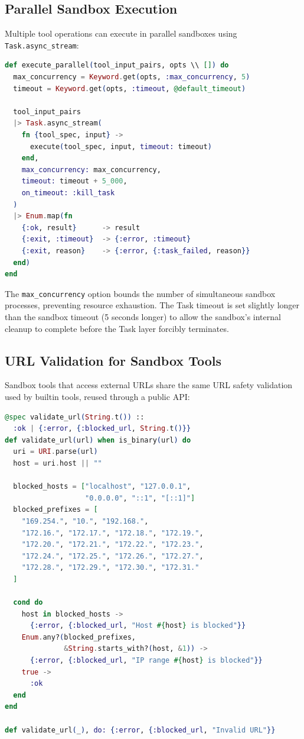 \documentclass[12pt,a4paper]{article}
\theoremstyle{plain}
\theoremstyle{definition}
\begin{document}
\subsection{Parallel Sandbox Execution}

Multiple tool operations can execute in parallel sandboxes using \texttt{Task.async\_stream}:

\begin{lstlisting}[language=elixir, caption={Parallel sandbox execution with controlled concurrency.}, label={lst:parallel-sandbox}]
def execute_parallel(tool_input_pairs, opts \\ []) do
  max_concurrency = Keyword.get(opts, :max_concurrency, 5)
  timeout = Keyword.get(opts, :timeout, @default_timeout)

  tool_input_pairs
  |> Task.async_stream(
    fn {tool_spec, input} ->
      execute(tool_spec, input, timeout: timeout)
    end,
    max_concurrency: max_concurrency,
    timeout: timeout + 5_000,
    on_timeout: :kill_task
  )
  |> Enum.map(fn
    {:ok, result}      -> result
    {:exit, :timeout}  -> {:error, :timeout}
    {:exit, reason}    -> {:error, {:task_failed, reason}}
  end)
end
\end{lstlisting}

The \texttt{max\_concurrency} option bounds the number of simultaneous sandbox processes, preventing resource exhaustion. The Task timeout is set slightly longer than the sandbox timeout (5 seconds longer) to allow the sandbox's internal cleanup to complete before the Task layer forcibly terminates.

\subsection{URL Validation for Sandbox Tools}

Sandbox tools that access external URLs share the same URL safety validation used by builtin tools, reused through a public API:

\begin{lstlisting}[language=elixir, caption={URL validation reused across tiers.}, label={lst:sandbox-url}]
@spec validate_url(String.t()) ::
  :ok | {:error, {:blocked_url, String.t()}}
def validate_url(url) when is_binary(url) do
  uri = URI.parse(url)
  host = uri.host || ""

  blocked_hosts = ["localhost", "127.0.0.1",
                   "0.0.0.0", "::1", "[::1]"]
  blocked_prefixes = [
    "169.254.", "10.", "192.168.",
    "172.16.", "172.17.", "172.18.", "172.19.",
    "172.20.", "172.21.", "172.22.", "172.23.",
    "172.24.", "172.25.", "172.26.", "172.27.",
    "172.28.", "172.29.", "172.30.", "172.31."
  ]

  cond do
    host in blocked_hosts ->
      {:error, {:blocked_url, "Host #{host} is blocked"}}
    Enum.any?(blocked_prefixes,
              &String.starts_with?(host, &1)) ->
      {:error, {:blocked_url, "IP range #{host} is blocked"}}
    true ->
      :ok
  end
end

def validate_url(_), do: {:error, {:blocked_url, "Invalid URL"}}
\end{lstlisting}
\end{document}
